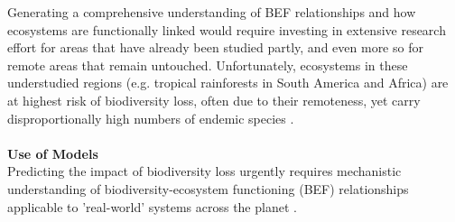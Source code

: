 Generating a comprehensive understanding of BEF relationships and how ecosystems are functionally linked would require investing in extensive research effort for areas that have already been studied partly, and even more so for remote areas that remain untouched. Unfortunately, ecosystems in these understudied regions (e.g. tropical rainforests in South America and Africa) are at highest risk of biodiversity loss, often due to their remoteness, yet carry disproportionally high numbers of endemic species \citep{Urban2015,Wake2008}.
\\\\
%
%
\textbf{Use of Models}\\
Predicting the impact of biodiversity loss urgently requires mechanistic understanding of biodiversity-ecosystem functioning (BEF) relationships applicable to 'real-world' systems across the planet \citep{Dobson2006,Estes2011}. 
%

